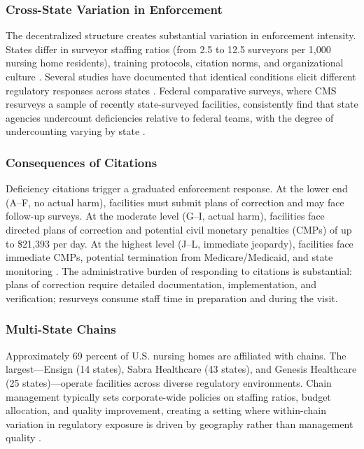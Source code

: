 \documentclass[12pt]{article}
\begin{document}
\subsubsection*{Cross-State Variation in Enforcement} The decentralized structure creates substantial variation in enforcement intensity. States differ in surveyor staffing ratios (from 2.5 to 12.5 surveyors per 1,000 nursing home residents), training protocols, citation norms, and organizational culture \citep{GAO2008, CMS2019}. Several studies have documented that identical conditions elicit different regulatory responses across states \citep{Harrington2004, Mukamel2012}. Federal comparative surveys, where CMS resurveys a sample of recently state-surveyed facilities, consistently find that state agencies undercount deficiencies relative to federal teams, with the degree of undercounting varying by state \citep{GAO2008}.

\subsubsection*{Consequences of Citations} Deficiency citations trigger a graduated enforcement response. At the lower end (A--F, no actual harm), facilities must submit plans of correction and may face follow-up surveys. At the moderate level (G--I, actual harm), facilities face directed plans of correction and potential civil monetary penalties (CMPs) of up to \$21,393 per day. At the highest level (J--L, immediate jeopardy), facilities face immediate CMPs, potential termination from Medicare/Medicaid, and state monitoring \citep{CMS2017}. The administrative burden of responding to citations is substantial: plans of correction require detailed documentation, implementation, and verification; resurveys consume staff time in preparation and during the visit.

\subsubsection*{Multi-State Chains} Approximately 69 percent of U.S. nursing homes are affiliated with chains. The largest---Ensign (14 states), Sabra Healthcare (43 states), and Genesis Healthcare (25 states)---operate facilities across diverse regulatory environments. Chain management typically sets corporate-wide policies on staffing ratios, budget allocation, and quality improvement, creating a setting where within-chain variation in regulatory exposure is driven by geography rather than management quality \citep{Grabowski2004, Bowblis2011}.
\end{document}
